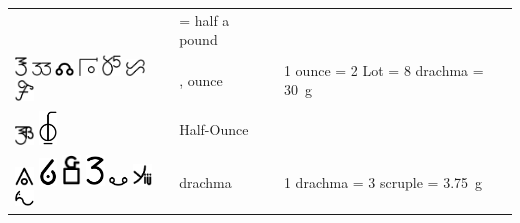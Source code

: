 \documentclass[british,final,landscape]{scrartcl}
\begin{document}
\begin{refsection}
\begin{supertabular}{p{0.3\textwidth}p{0.34\textwidth}p{0.34\textwidth}}
   &  = half a pound & \\
   \includegraphics[height=5mm]{Measures/Ounce}  \includegraphics[width=5mm]{Measures/Ounce2} \includegraphics[width=5mm]{Measures/Ounce3} \includegraphics[width=5mm]{Measures/Ounce4} \includegraphics[width=5mm]{Measures/Ounce5} \includegraphics[width=5mm]{Measures/Ounce6} \includegraphics[width=5mm]{Measures/Ounce7} & , ounce & 1 ounce = 2 Lot = 8 drachma = \SI{30}{g}\\
   \includegraphics[width=5mm]{Measures/HalfOunce} \includegraphics[width=5mm]{Measures/HalfOunce2} & Half-Ounce &  \\
   \includegraphics[width=5mm]{Measures/Drachma}   \includegraphics[width=5mm]{Measures/Drachma2}  \includegraphics[width=5mm]{Measures/Drachma3} \includegraphics[width=5mm]{Measures/Drachma4}  \includegraphics[width=5mm]{Measures/Drachma5}  \includegraphics[width=5mm]{Measures/Drachma6} \includegraphics[width=5mm]{Measures/Drachma7} & drachma & 1 drachma = 3 scruple = \SI{3.75}{g} \\

\end{supertabular}
\end{refsection}
\end{document}
